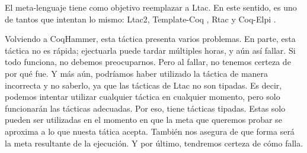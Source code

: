 El meta-lenguaje \Mtac \cite{DBLP:journals/pacmpl/KaiserZKRD18} tiene como objetivo reemplazar a Ltac.
En este sentido, es uno de tantos que intentan lo mismo: Ltac2, Template-Coq \cite{DBLP:conf/itp/AnandBCST18}, Rtac \cite{DBLP:conf/esop/MalechaB16} y Coq-Elpi \cite{tassi:hal-01637063}.

Volviendo a CoqHammer, esta táctica presenta varios problemas.
En parte, esta táctica no es rápida; ejectuarla puede tardar múltiples horas, y aún así fallar.
Si todo funciona, no debemos preocuparnos.
Pero al fallar, no tenemos certeza de por qué fue.
Y más aún, podríamos haber utilizado la táctica de manera incorrecta y no saberlo, ya que las tácticas de Ltac no son tipadas.
Es decir, podemos intentar utilizar cualquier táctica en cualquier momento, pero solo funcionarán las tácticas adecuadas.
Por eso, \mtac tiene tácticas tipadas.
Estas solo pueden ser utilizadas en el momento en que la meta que queremos probar se aproxima a lo que nuesta tática acepta.
También nos asegura de que forma será la meta resultante de la ejecución.
Y por último, tendremos certeza de cómo falla.


